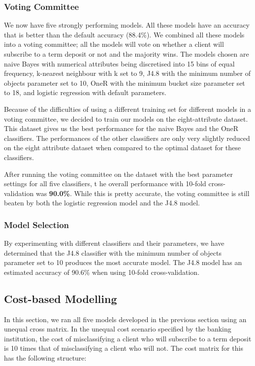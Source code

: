 \documentclass[a4paper,11pt]{article}
\begin{document}
\subsubsection{Voting Committee}

We now have five strongly performing models. All these models have an accuracy that is better than the default accuracy (88.4\%).
We combined all these models into a voting committee; all the models will vote on whether a client will subscribe to a term
deposit or not and the majority wins. The models chosen are naive Bayes with numerical attributes being discretised
into 15 bins of equal frequency, k-nearest neighbour with k set to 9, J4.8 with the minimum number of objects parameter set to 10,
OneR with the minimum bucket size parameter set to 18, and logistic regression with default parameters.

Because of the difficulties of using a different training set for different models in a voting committee, we decided to train
our models on the eight-attribute dataset. This dataset gives us the best performance for the naive Bayes and the OneR
classifiers. The performances of the other classifiers are only very slightly reduced on the eight attribute dataset when compared
to the optimal dataset for these classifiers.

After running the voting committee on the dataset with the best parameter settings for all five classifiers, t
he overall performance with 10-fold cross-validation was \textbf{90.0\%}. While this is pretty accurate, the
voting committee is still beaten by both the logistic regression model and the J4.8 model.

\subsubsection{Model Selection}

By experimenting with different classifiers and their parameters, we have determined that the J4.8 classifier with the minimum
number of objects parameter set to 10 produces the most accurate model. The J4.8 model has an estimated accuracy of 90.6\%
when using 10-fold cross-validation.

\subsection{Cost-based Modelling}

In this section, we ran all five models developed in the previous section using an unequal cross matrix. In the unequal
cost scenario specified by the banking institution, the cost of misclassifying a client who will subscribe to a term deposit
is 10 times that of misclassifying a client who will not. The cost matrix for this has the following structure:
\end{document}
